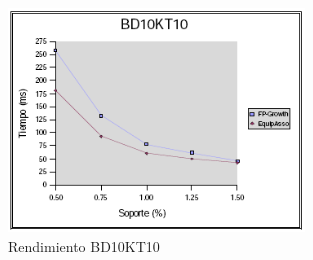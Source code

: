 \begin{figure}[h]
\centering
\includegraphics[width=0.7\textwidth]{images/bd10kt102.png}
\caption{Rendimiento BD10KT10}
\label{10k2}
\end{figure}


